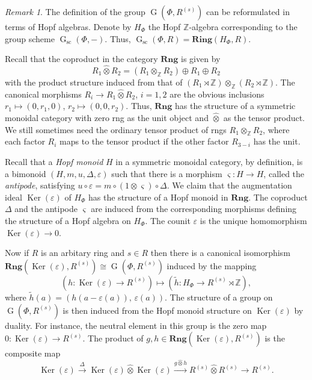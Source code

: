 \documentclass[oneside, 11pt]{amsart}
\numberwithin{equation}{section}
\theoremstyle{definition}
\theoremstyle{remark}
\newtheorem{rem}[lemma]{Remark}
\DeclareMathOperator\Ker{Ker}
\DeclareMathOperator\GG{G}
\newcommand{\Rng}{\mathbf{Rng}}
\newcommand{\ZZ}{\mathbb{Z}}
\newcommand{\otimeshat}{\mathbin{\widehat{\otimes}}}
\begin{document}
\begin{rem}
 The definition of the group $\GG(\Phi, R^{(s)})$ can be reformulated in terms of Hopf algebras. Denote by \(H_\Phi\) the Hopf \(\ZZ\)-algebra corresponding to the group scheme \(\GG_{\mathrm{sc}}(\Phi, -)\). Thus, $\GG_\mathrm{sc}(\Phi, R) = \mathbf{Ring}(H_\Phi, R)$.
 
 Recall that the coproduct in the category $\Rng$ is given by \[R_1 \otimeshat R_2 = (R_1 \otimes_{\ZZ} R_2) \oplus R_1 \oplus R_2\]
 with the product structure induced from that of $(R_1\rtimes\mathbb Z)\otimes_{\mathbb Z}(R_2\rtimes\mathbb Z)$. The canonical morphisms $R_i \to R_1 \otimeshat R_2$, $i=1,2$ are the obvious inclusions $r_1 \mapsto (0, r_1, 0)$, $r_2 \mapsto (0, 0, r_2)$.
 Thus, $\Rng$ has the structure of a symmetric monoidal category with zero rng as the unit object and $\otimeshat$ as the tensor product. We still sometimes need the ordinary tensor product of rngs \(R_1 \otimes_{\mathbb Z} R_2\), where each factor \(R_i\) maps to the tensor product if the other factor \(R_{3 - i}\) has the unit.

 Recall that a {\it Hopf monoid} $H$ in a symmetric monoidal category, by definition, is a bimonoid $(H, m, u, \Delta, \varepsilon)$ such that there is a morphism $\varsigma\colon H\to H$, called the {\it antipode}, satisfying $u \circ \varepsilon = m \circ (1 \otimes \varsigma) \circ \Delta$.
 We claim that the augmentation ideal \(\Ker(\varepsilon)\) of $H_\Phi$ has the structure of a Hopf monoid in \(\Rng\). The coproduct $\Delta$ and the antipode $\varsigma$ are induced from the corresponding morphisms defining the structure of a Hopf algebra on $H_\Phi$. The counit $\varepsilon$ is the unique homomorphism $\Ker(\varepsilon) \to 0$.
 
 Now if $R$ is an arbitary ring and $s \in R$ then there is a canonical isomorphism \(\Rng(\Ker(\varepsilon), R^{(s)}) \cong \GG(\Phi, R^{(s)})\) induced by the mapping 
 \[(h \colon \Ker(\varepsilon) \to R^{(s)}) \mapsto (\widetilde{h} \colon H_\Phi \to R^{(s)}\rtimes\ZZ), \]
 where $\widetilde{h}(a) = \left(h(a - \varepsilon(a)),\, \varepsilon(a)\right)$.
 The structure of a group on $\GG(\Phi, R^{(s)})$ is then induced from the Hopf monoid structure on $\Ker(\varepsilon)$ by duality.
 For instance, the neutral element in this group is the zero map \(0 \colon \Ker(\varepsilon) \to R^{(s)}\). The product of \(g, h \in \Rng(\Ker(\varepsilon), R^{(s)})\) is the composite map
 \[\Ker(\varepsilon) \xrightarrow{\Delta} \Ker(\varepsilon) \otimeshat \Ker(\varepsilon) \xrightarrow{g \otimeshat h} R^{(s)} \otimeshat R^{(s)} \to R^{(s)}.\]
\end{rem}
\end{document}
